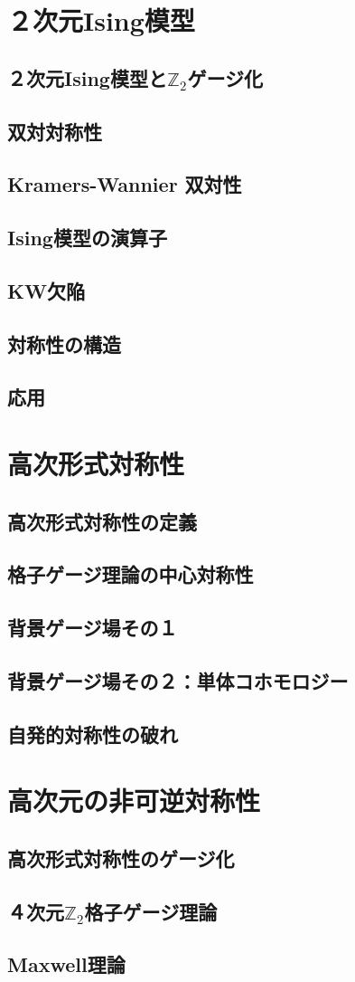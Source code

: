 \documentclass[report,paper=a4, fontsize=12pt, line_length=16cm, number_of_lines=33,dvipdfmx]{jlreq}
\numberwithin{equation}{chapter}
\newcommand{\Ztwo}{\mbox{$\mathbb{Z}_{2}$}}
\begin{document}
\chapter{２次元Ising模型}

\section{２次元Ising模型と\texorpdfstring{\Ztwo}{Z2}ゲージ化}
\section{双対対称性}
\section{Kramers-Wannier 双対性}
\section{Ising模型の演算子}
\section{KW欠陥}
\section{対称性の構造}
\section{応用}


\chapter{高次形式対称性}
\section{高次形式対称性の定義}
\section{格子ゲージ理論の中心対称性}
\section{背景ゲージ場その１}
\section{背景ゲージ場その２：単体コホモロジー}
\section{自発的対称性の破れ}


\chapter{高次元の非可逆対称性}
\section{高次形式対称性のゲージ化}
\section{４次元\texorpdfstring{\Ztwo}{Z2}格子ゲージ理論}
\section{Maxwell理論}



\end{document}

